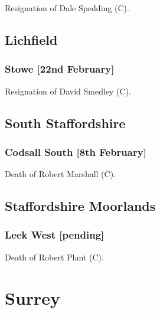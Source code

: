 \documentclass[a4paper,openany]{book}
\begin{document}
\begin{resultsiii}
Resignation of Dale Spedding (C).

\subsection*{Lichfield}

\subsubsection*{Stowe \hspace*{\fill}\nolinebreak[1]%
\enspace\hspace*{\fill}
[22nd February]}


Resignation of David Smedley (C).

\subsection*{South Staffordshire}

\subsubsection*{Codsall South \hspace*{\fill}\nolinebreak[1]%
\enspace\hspace*{\fill}
[8th February]}


Death of Robert Marshall (C).

\subsection*{Staffordshire Moorlands}

\subsubsection*{Leek West \hspace*{\fill}\nolinebreak[1]%
\enspace\hspace*{\fill}
[pending]}


Death of Robert Plant (C).

\section{Surrey}


\end{resultsiii}
\end{document}

